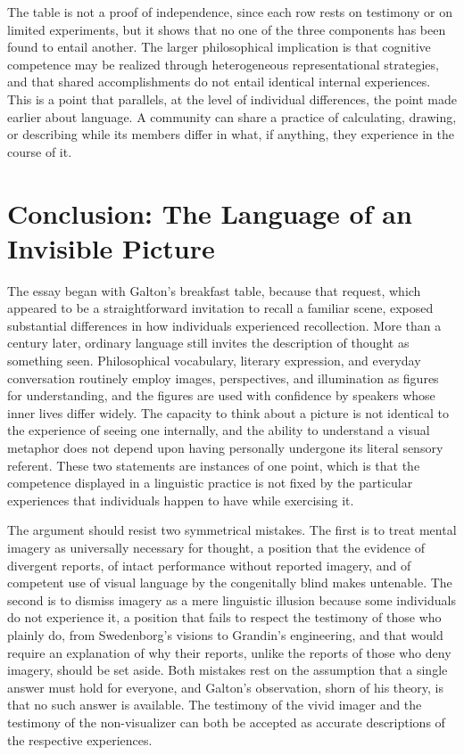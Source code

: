 \documentclass[11pt]{article}
\theoremstyle{remark}
\begin{document}
The table is not a proof of independence, since each row rests on testimony or on limited experiments, but it shows that no one of the three components has been found to entail another. The larger philosophical implication is that cognitive competence may be realized through heterogeneous representational strategies, and that shared accomplishments do not entail identical internal experiences. This is a point that parallels, at the level of individual differences, the point made earlier about language. A community can share a practice of calculating, drawing, or describing while its members differ in what, if anything, they experience in the course of it.

\section{Conclusion: The Language of an Invisible Picture}

The essay began with Galton's breakfast table, because that request, which appeared to be a straightforward invitation to recall a familiar scene, exposed substantial differences in how individuals experienced recollection. More than a century later, ordinary language still invites the description of thought as something seen. Philosophical vocabulary, literary expression, and everyday conversation routinely employ images, perspectives, and illumination as figures for understanding, and the figures are used with confidence by speakers whose inner lives differ widely. The capacity to think about a picture is not identical to the experience of seeing one internally, and the ability to understand a visual metaphor does not depend upon having personally undergone its literal sensory referent. These two statements are instances of one point, which is that the competence displayed in a linguistic practice is not fixed by the particular experiences that individuals happen to have while exercising it.

The argument should resist two symmetrical mistakes. The first is to treat mental imagery as universally necessary for thought, a position that the evidence of divergent reports, of intact performance without reported imagery, and of competent use of visual language by the congenitally blind makes untenable. The second is to dismiss imagery as a mere linguistic illusion because some individuals do not experience it, a position that fails to respect the testimony of those who plainly do, from Swedenborg's visions to Grandin's engineering, and that would require an explanation of why their reports, unlike the reports of those who deny imagery, should be set aside. Both mistakes rest on the assumption that a single answer must hold for everyone, and Galton's observation, shorn of his theory, is that no such answer is available. The testimony of the vivid imager and the testimony of the non-visualizer can both be accepted as accurate descriptions of the respective experiences.
\end{document}
